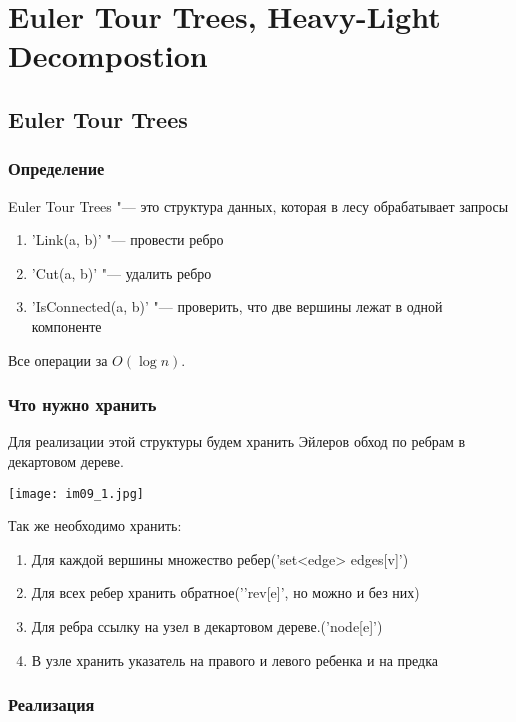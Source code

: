 ﻿\chapter{Euler Tour Trees, Heavy-Light Decompostion}

\section{Euler Tour Trees}
\subsection{Определение}
Euler Tour Trees "--- это структура данных, которая в лесу обрабатывает запросы
\begin{enumerate}
	\item \cpp'Link(a, b)' "--- провести ребро
	\item \cpp'Cut(a, b)' "--- удалить ребро
	\item \cpp'IsConnected(a, b)' "--- проверить, что две вершины лежат в одной компоненте
\end{enumerate}
Все операции за $O(\log n)$.

\subsection{Что нужно хранить}

Для реализации этой структуры будем хранить Эйлеров обход по ребрам в декартовом дереве.

\begin{center}
\texttt{[image: im09\_1.jpg]}
\end{center}

Так же необходимо хранить:
\begin{enumerate}
	\item Для каждой вершины множество ребер(\cpp'set<edge> edges[v]')
	\item Для всех ребер хранить обратное('\cpp'rev[e]', но можно и без них)
	\item Для ребра ссылку на узел в декартовом дереве.(\cpp'node[e]')
	\item В узле хранить указатель на правого и левого ребенка и на предка
\end{enumerate}

\subsection{Реализация}

